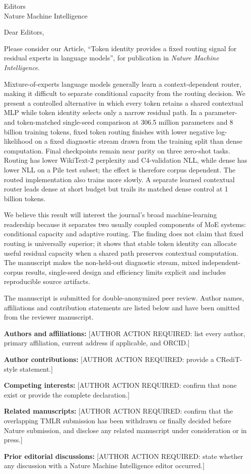 \documentclass[10pt]{letter}
\begin{document}
\setlength{\parskip}{0.25em}

\begin{letter}{Editors\\Nature Machine Intelligence}
\opening{Dear Editors,}

Please consider our Article, ``Token identity provides a fixed routing signal for residual experts in language models'', for publication in \emph{Nature Machine Intelligence}.

Mixture-of-experts language models generally learn a context-dependent router, making it difficult to separate conditional capacity from the routing decision. We present a controlled alternative in which every token retains a shared contextual MLP while token identity selects only a narrow residual path. In a parameter- and token-matched single-seed comparison at 306.5 million parameters and 8 billion training tokens, fixed token routing finishes with lower negative log-likelihood on a fixed diagnostic stream drawn from the training split than dense computation. Final checkpoints remain near parity on three zero-shot tasks. Routing has lower WikiText-2 perplexity and C4-validation NLL, while dense has lower NLL on a Pile test subset; the effect is therefore corpus dependent. The routed implementation also trains more slowly. A separate learned contextual router leads dense at short budget but trails its matched dense control at 1 billion tokens.

We believe this result will interest the journal's broad machine-learning readership because it separates two usually coupled components of MoE systems: conditional capacity and adaptive routing. The finding does not claim that fixed routing is universally superior; it shows that stable token identity can allocate useful residual capacity when a shared path preserves contextual computation. The manuscript makes the non-held-out diagnostic stream, mixed independent-corpus results, single-seed design and efficiency limits explicit and includes reproducible source artifacts.

The manuscript is submitted for double-anonymized peer review. Author names, affiliations and contribution statements are listed below and have been omitted from the reviewer manuscript.

\textbf{Authors and affiliations:} [AUTHOR ACTION REQUIRED: list every author, primary affiliation, current address if applicable, and ORCID.]\par
\textbf{Author contributions:} [AUTHOR ACTION REQUIRED: provide a CRediT-style statement.]\par
\textbf{Competing interests:} [AUTHOR ACTION REQUIRED: confirm that none exist or provide the complete declaration.]\par
\textbf{Related manuscripts:} [AUTHOR ACTION REQUIRED: confirm that the overlapping TMLR submission has been withdrawn or finally decided before Nature submission, and disclose any related manuscript under consideration or in press.]\par
\textbf{Prior editorial discussions:} [AUTHOR ACTION REQUIRED: state whether any discussion with a Nature Machine Intelligence editor occurred.]


\end{letter}
\end{document}
